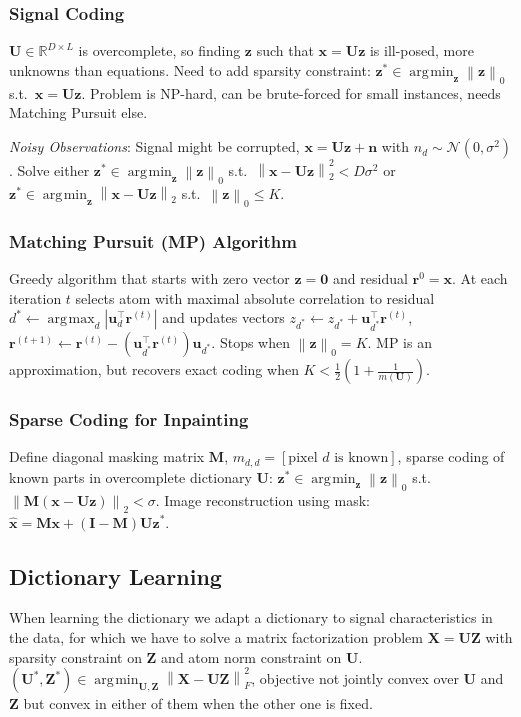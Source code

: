 \documentclass[11pt,a4paper,technote]{IEEEtran}
\DeclareMathOperator*{\argmin}{\arg\!\min}
\DeclareMathOperator*{\argmax}{\arg\!\max}
\newcommand{\iver}[1]{\left[#1\right]}
\newcommand{\abs}[1]{\left\lvert#1\right\rvert}
\newcommand{\norm}[1]{\left\lVert#1\right\rVert}
\newcommand{\matr}[1]{\boldsymbol{\mathbf{#1}}}
\newcommand{\vect}[1]{\boldsymbol{\mathbf{#1}}}
\newcommand{\trns}[1]{#1^{\top}}
\newcommand{\normal}{\mathcal{N}}
\newcommand{\R}{\mathbb{R}}
\begin{document}
\subsubsection*{Signal Coding}
$\matr{U}\in\R^{D \times L}$ is overcomplete, so finding $\vect{z}$ such that
$\vect{x} = \matr{U}\vect{z}$ is ill-posed, more unknowns than equations. Need
to add sparsity constraint: $\vect{z}^*\in\argmin_{\vect{z}} \norm{\vect{z}}_0$
s.t.\ $\vect{x} = \matr{U}\vect{z}$. Problem is NP-hard, can be brute-forced for
small instances, needs Matching Pursuit else.

\emph{Noisy Observations}: Signal might be corrupted, $\vect{x} = \matr{U}
\vect{z} + \vect{n}$ with $n_d \sim \normal(0,\sigma^2)$. Solve either
$\vect{z}^* \in \argmin_{\vect{z}}\norm{\vect{z}}_0$ s.t.\ $\norm{\vect{x} -
  \matr{U}\vect{z}}_2^2 < D\sigma^2$ or $\vect{z}^* \in \argmin_{\vect{z}}
\norm{\vect{x} - \matr{U} \vect{z}}_2$ s.t.\ $\norm{\vect{z}}_0 \leq K$.

\subsubsection*{Matching Pursuit (MP) Algorithm} Greedy algorithm that starts
with zero vector $\vect{z} = \vect{0}$ and residual $\vect{r}^0 = \vect{x}$. At
each iteration $t$ selects atom with maximal absolute correlation to residual
$d^* \gets \argmax_d \abs{\trns{\vect{u}_d} \vect{r}^{(t)}}$ and updates
vectors $z_{d^*} \gets z_{d^*} + \trns{\vect{u}_{d^*}} \vect{r}^{(t)}$,
$\vect{r}^{(t+1)} \gets \vect{r}^{(t)} - (\trns{\vect{u}_{d^*}} \vect{r}^{(t)})
\vect{u}_{d^*}$. Stops when $\norm{\vect{z}}_0 = K$. MP is an approximation,
but recovers exact coding when $K < \frac{1}{2}(1 + \frac{1}{m(\matr{U})})$.

\subsubsection*{Sparse Coding for Inpainting}
Define diagonal masking matrix $\matr{M}$, $m_{d,d} = \iver{\text{pixel $d$ is
    known}}$, sparse coding of known parts in overcomplete dictionary
$\matr{U}$: $\vect{z}^* \in \argmin_{\vect{z}} \norm{\vect{z}}_0$ s.t.\
$\norm{\matr{M}(\vect{x} - \matr{U}\vect{z})}_2 < \sigma$. Image reconstruction
using mask: $\hat{\vect{x}} = \matr{M}\vect{x} + (\matr{I} - \matr{M})
\matr{U}\vect{z}^*$.

\vspace{-1em}
\subsection*{Dictionary Learning}
When learning the dictionary we adapt a dictionary to signal
characteristics in the data, for which we have to solve a matrix
factorization problem $\matr{X} = \matr{U}\matr{Z}$ with sparsity
constraint on $\matr{Z}$ and atom norm constraint on $\matr{U}$.
$(\matr{U}^*, \matr{Z}^*) \in \argmin_{\matr{U},\matr{Z}} \norm{\matr{X} -
  \matr{U}\matr{Z}}_F^2$, objective not jointly convex over $\matr{U}$ and
$\matr{Z}$ but convex in either of them when the other one is fixed.
\end{document}
